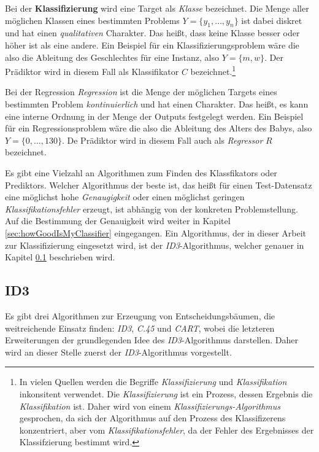 Bei der \textbf{Klassifizierung} wird eine Target als \emph{Klasse} bezeichnet. Die Menge aller möglichen Klassen eines bestimmten Problems $Y = \{ y_1 , \ldots, y_n\}$ ist dabei diskret und hat einen \emph{qualitativen} Charakter. Das heißt, dass keine Klasse \glqq besser\grqq{} oder \glqq höher\grqq{} ist als eine andere. Ein Beispiel für ein Klassifizierungsproblem wäre die also die Ableitung des Geschlechtes für eine Instanz, also $Y = \{m, w\}$. Der Prädiktor wird in diesem Fall als Klassifikator $C$ bezeichnet.\footnote{In vielen Quellen werden die Begriffe \emph{Klassifizierung} und \emph{Klassifikation} inkonsitent verwendet. Die \emph{Klassifizierung} ist ein Prozess, dessen Ergebnis die \emph{Klassifikation} ist. Daher wird von einem \emph{Klassifizierungs-Algorithmus} gesprochen, da sich der Algorithmus auf den Prozess des Klassifizerens konzentriert, aber vom \emph{Klassifikationsfehler}, da der Fehler des Ergebnisses der Klassifzierung bestimmt wird.} \cite[S. 28, 127]{statistical_learning}

Bei der Regression \emph{Regression} ist die Menge der möglichen Targets eines bestimmten Problem \emph{kontinuierlich} und hat einen  Charakter. Das heißt, es kann eine interne Ordnung in der Menge der Outputs festgelegt werden. Ein Beispiel für ein Regressionsproblem wäre die also die Ableitung des Alters des Babys, also $Y = \{0 , \ldots , 130\}$. De Prädiktor wird in diesem Fall auch als \emph{Regressor} $R$ bezeichnet.\cite[S. 24]{learning_cart_dobra} \cite[S. 8]{machine_marsland} \cite[S. 28]{statistical_learning}

Es gibt eine Vielzahl an Algorithmen zum Finden des Klassfikators oder Prediktors. Welcher Algorithmus der \glqq beste\grqq{} ist, das heißt für einen Test-Datensatz eine möglichst hohe \emph{Genaugigkeit} oder einen möglichst geringen \emph{Klassifikationsfehler} erzeugt, ist abhängig von der konkreten Problemstellung. Auf die Bestimmung der Genauigkeit wird weiter in Kapitel \ref{sec:howGoodIsMyClassifier} eingegangen. Ein Algorithmus, der in dieser Arbeit zur Klassifizierung eingesetzt wird, ist der \emph{ID3}-Algorithmus, welcher genauer in Kapitel \ref{sec:id3} beschrieben wird.

\subsection{ID3}
\label{sec:id3}

Es gibt drei Algorithmen zur Erzeugung von Entscheidungsbäumen, die weitreichende Einsatz finden: \emph{ID3}, \emph{C.45} und \emph{CART}, wobei die letzteren Erweiterungen der grundlegenden Idee des \emph{ID3}-Algorithmus darstellen. Daher wird an dieser Stelle zuerst der \emph{ID3}-Algorithmus vorgestellt. 

